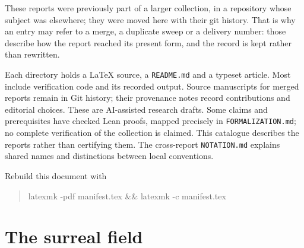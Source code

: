 \documentclass[11pt]{article}
\begin{document}
These reports were previously part of a larger collection, in a repository
whose subject was elsewhere; they were moved here with their git history.
That is why an entry may refer to a merge, a duplicate sweep or a delivery
number: those describe how the report reached its present form, and the
record is kept rather than rewritten.

Each directory holds a \LaTeX{} source, a \texttt{README.md} and a typeset article.
Most include verification code and its recorded output.
Source manuscripts for merged reports remain in Git history; their
provenance notes record contributions and editorial choices. These are
AI-assisted research drafts. Some claims and prerequisites have checked Lean
proofs, mapped precisely in \texttt{FORMALIZATION.md}; no complete verification
of the collection is claimed. This catalogue describes the reports rather than
certifying them. The cross-report \texttt{NOTATION.md} explains shared names
and distinctions between local conventions.

\medskip
\noindent
Rebuild this document with
\begin{quote}\ttfamily
latexmk -pdf manifest.tex \&\& latexmk -c manifest.tex
\end{quote}

\section{The surreal field}
\end{document}
